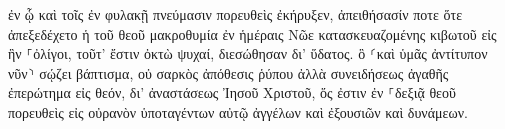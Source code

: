 \documentclass{openreader}
\begin{document}
ἐν ᾧ καὶ τοῖς ἐν φυλακῇ πνεύμασιν πορευθεὶς ἐκήρυξεν, 
ἀπειθήσασίν ποτε ὅτε ἀπεξεδέχετο ἡ τοῦ θεοῦ μακροθυμία ἐν ἡμέραις Νῶε κατασκευαζομένης κιβωτοῦ εἰς ἣν ⸀ὀλίγοι, τοῦτ’ ἔστιν ὀκτὼ ψυχαί, διεσώθησαν δι’ ὕδατος. 
ὃ ⸂καὶ ὑμᾶς ἀντίτυπον νῦν⸃ σῴζει βάπτισμα, οὐ σαρκὸς ἀπόθεσις ῥύπου ἀλλὰ συνειδήσεως ἀγαθῆς ἐπερώτημα εἰς θεόν, δι’ ἀναστάσεως Ἰησοῦ Χριστοῦ, 
ὅς ἐστιν ἐν ⸀δεξιᾷ θεοῦ πορευθεὶς εἰς οὐρανὸν ὑποταγέντων αὐτῷ ἀγγέλων καὶ ἐξουσιῶν καὶ δυνάμεων. 
\end{document}
